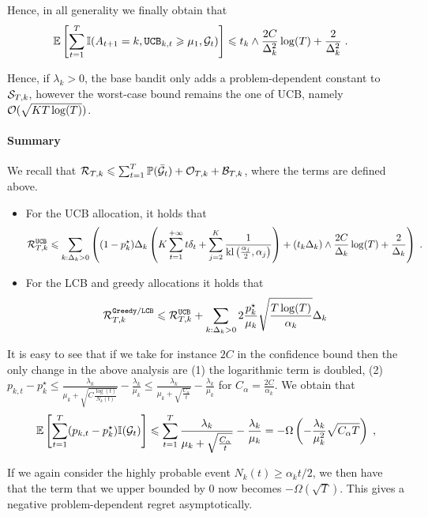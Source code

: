 Hence, in all generality we finally obtain that 
\begin{align*}
\mathbb{E}\left[\sum_{t=1}^T \mathbb{I}(A_{t+1}=k, \texttt{UCB}_{k, t}\geqslant \mu_1, \mathcal{G}_t)\right] &\leqslant t_k \wedge  \frac{2C}{\Delta_k^2}\log(T) + \frac{2}{\Delta_k^2} \;.
\end{align*}

Hence, if $\lambda_k>0$, the base bandit only adds a problem-dependent constant to $\mathcal{S}_{T,k}$, however the worst-case bound remains the one of UCB, namely $\mathcal{O}(\sqrt{KT\log(T)})$.

\paragraph{Summary} We recall that $\mathcal{R}_{T,k}\leqslant \sum_{t=1}^T \mathbb{P}(\bar {\mathcal{G}}_t)+\mathcal{O}_{T, k}+ \mathcal{B}_{T,k}$, where the terms are defined above. 
\begin{itemize}
	\item For the UCB allocation, it holds that 
	\[\mathcal{R}_{T,k}^\text{\texttt{UCB}} \leqslant \sum_{k: \Delta_k>0}\left((1-p_k^\star)\Delta_k \left(K \sum_{t=1}^{+\infty} t\delta_t + \sum_{j=2}^K\frac{1}{\text{\normalfont kl}\left(\frac{\alpha_j}{2}, \alpha_j\right)}\right) + (t_k\Delta_k) \wedge  \frac{2C}{\Delta_k}\log(T) + \frac{2}{\Delta_k} \right) \;. \]
	\item For the LCB and greedy allocations it holds that 
	\[ \mathcal{R}_{T,k}^{\texttt{Greedy}/\texttt{LCB}} \leqslant \mathcal{R}_{T,k}^{\texttt{UCB}} + \sum_{k:\Delta_k>0} 2\frac{p_k^\star}{\mu_k}\sqrt{\frac{T\log(T)}{\alpha_k}} \Delta_k
	\]
\end{itemize}



\begin{remark} 
	
	It is easy to see that if we take for instance $2C$ in the confidence bound then the only change in the above analysis are (1) the logarithmic term is doubled, (2) $p_{k, t}-p_k^\star\leq \frac{\lambda_k}{\mu_k+\sqrt{C\frac{\log(t)}{N_k(t)}}}-\frac{\lambda_k}{\mu_k}\leq \frac{\lambda_k}{\mu_k+\sqrt{\frac{C_\alpha}{t}}}-\frac{\lambda_k}{\mu_k}$ for $C_\alpha=\frac{2C}{\alpha_k}$. We obtain that
	\[\mathbb{E}\left[\sum_{t=1}^T(p_{k,t}-p_k^\star)\mathbb{I}(\mathcal{G}_t)\right] \leqslant \sum_{t=1}^T \frac{\lambda_k}{\mu_k+\sqrt{\frac{C_\alpha}{t}}}-\frac{\lambda_k}{\mu_k} = -\Omega\left(-\frac{\lambda_k}{\mu_k^2}\sqrt{C_\alpha T}\right)\;,
	\]
	
	If we again consider the highly probable event $N_k(t)\geq \alpha_k t/2$, we then have that the term that we upper bounded by $0$ now becomes $-\Omega(\sqrt{T})$. This gives a negative problem-dependent regret asymptotically.
\end{remark}


